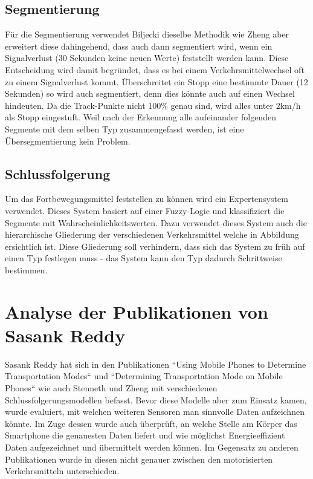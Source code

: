 \subsection{Segmentierung}
Für die Segmentierung verwendet Biljecki dieselbe Methodik wie Zheng aber erweitert diese dahingehend, dass auch dann segmentiert wird, wenn ein Signalverlust (30 Sekunden keine neuen Werte) feststellt werden kann. Diese Entscheidung wird damit begründet, dass es bei einem Verkehrsmittelwechsel oft zu einem Signalverlust kommt. 
Überschreitet ein Stopp eine bestimmte Dauer (12 Sekunden) so wird auch segmentiert, denn dies könnte auch auf einen Wechsel hindeuten. Da die Track-Punkte nicht 100\% genau sind, wird alles unter 2km/h als Stopp eingestuft. Weil nach der Erkennung alle aufeinander folgenden Segmente mit dem selben Typ zusammengefasst werden, ist eine Übersegmentierung kein Problem.

\subsection{Schlussfolgerung}
Um das Fortbewegungsmittel feststellen zu können wird ein Expertensystem verwendet. Dieses System basiert auf einer Fuzzy-Logic und klassifiziert die Segmente mit Wahrscheinlichkeitswerten. Dazu verwendet dieses System auch die hierarchische Gliederung der verschiedenen Verkehrsmittel welche in Abbildung  ersichtlich ist. Diese Gliederung soll verhindern, dass sich das System zu früh auf einen Typ festlegen muss - das System kann den Typ dadurch Schrittweise bestimmen.



\section{Analyse der Publikationen von Sasank Reddy}
Sasank Reddy hat sich in den Publikationen ``Using Mobile Phones to Determine Transportation Modes`` \cite{reddy_using_2010} und ``Determining Transportation Mode on Mobile Phones`` \cite{reddy_determining_2008} wie auch Stenneth und Zheng mit verschiedenen Schlussfolgerungsmodellen befasst. Bevor diese Modelle aber zum Einsatz kamen, wurde evaluiert, mit welchen weiteren Sensoren man sinnvolle Daten aufzeichnen könnte. Im Zuge dessen wurde auch überprüft, an welche Stelle am Körper das Smartphone die genauesten Daten liefert und wie möglichst Energieeffizient Daten aufgezeichnet und übermittelt werden können. Im Gegensatz zu anderen Publikationen wurde in diesen nicht genauer zwischen den motorisierten Verkehrsmitteln unterschieden.

